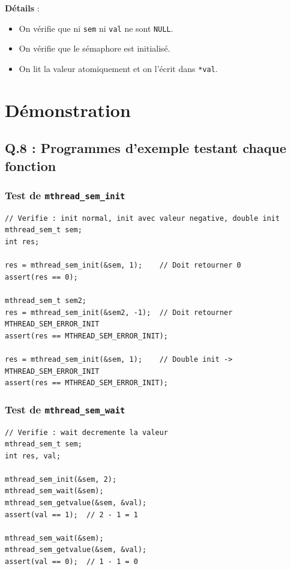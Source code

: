 \documentclass[12pt,a4paper]{article}
\begin{document}
\textbf{Détails} :
\begin{itemize}
  \item On vérifie que ni \texttt{sem} ni \texttt{val} ne sont \texttt{NULL}.
  \item On vérifie que le sémaphore est initialisé.
  \item On lit la valeur atomiquement et on l'écrit dans \texttt{*val}.
\end{itemize}

\section{Démonstration}

\subsection*{Q.8 : Programmes d'exemple testant chaque fonction}

\subsubsection*{Test de \texttt{mthread\_sem\_init}}

\begin{lstlisting}
// Verifie : init normal, init avec valeur negative, double init
mthread_sem_t sem;
int res;

res = mthread_sem_init(&sem, 1);    // Doit retourner 0
assert(res == 0);

mthread_sem_t sem2;
res = mthread_sem_init(&sem2, -1);  // Doit retourner MTHREAD_SEM_ERROR_INIT
assert(res == MTHREAD_SEM_ERROR_INIT);

res = mthread_sem_init(&sem, 1);    // Double init -> MTHREAD_SEM_ERROR_INIT
assert(res == MTHREAD_SEM_ERROR_INIT);
\end{lstlisting}

\subsubsection*{Test de \texttt{mthread\_sem\_wait}}

\begin{lstlisting}
// Verifie : wait decremente la valeur
mthread_sem_t sem;
int res, val;

mthread_sem_init(&sem, 2);
mthread_sem_wait(&sem);
mthread_sem_getvalue(&sem, &val);
assert(val == 1);  // 2 - 1 = 1

mthread_sem_wait(&sem);
mthread_sem_getvalue(&sem, &val);
assert(val == 0);  // 1 - 1 = 0
\end{lstlisting}
\end{document}
